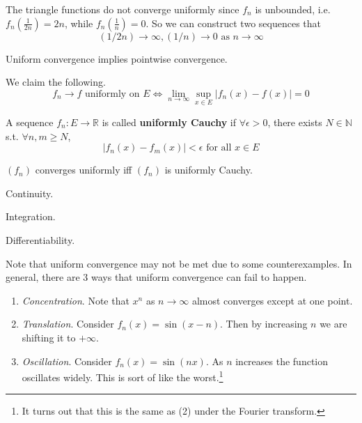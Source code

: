   \begin{example}
    The triangle functions do not converge uniformly since $f_n$ is unbounded, i.e. $f_n (\frac{1}{2n}) = 2n$, while $f_n ( \frac{1}{n}) = 0$. So we can construct two sequences that  
    \begin{equation}
      (1/2n) \to \infty, (1/n) \to 0 \text{ as } n \to \infty
    \end{equation}
  \end{example}

  \begin{theorem}
    Uniform convergence implies pointwise convergence. 
  \end{theorem} 

  \begin{theorem}
    We claim the following. 
    \begin{equation}
      f_n \to f \text{ uniformly on } E \iff \lim_{n \to \infty} \sup_{x \in E} |f_n (x) - f(x)| = 0
    \end{equation}
  \end{theorem}

  \begin{definition}
    A sequence $f_n: E \to \mathbb{R}$ is called \textbf{uniformly Cauchy} if $\forall \epsilon > 0$, there exists $N \in \mathbb{N}$ s.t. $\forall n, m \geq N$, 
    \begin{equation}
      |f_n (x) - f_m (x)| < \epsilon \text{ for all } x \in E
    \end{equation}
  \end{definition}

  \begin{lemma} 
    $(f_n)$ converges uniformly iff $(f_n)$ is uniformly Cauchy. 
  \end{lemma}

  Continuity. 

  Integration. 

  Differentiability. 

  Note that uniform convergence may not be met due to some counterexamples. In general, there are 3 ways that uniform convergence can fail to happen. 

  \begin{enumerate}
    \item \textit{Concentration}. Note that $x^n$ as $n \to \infty$ almost converges except at one point. 
    \item \textit{Translation}. Consider $f_n (x) = \sin(x - n)$. Then by increasing $n$ we are shifting it to $+\infty$. 
    \item \textit{Oscillation}. Consider $f_n (x) = \sin(nx)$. As $n$ increases the function oscillates widely. This is sort of like the worst.\footnote{It turns out that this is the same as (2) under the Fourier transform.} 
  \end{enumerate}

